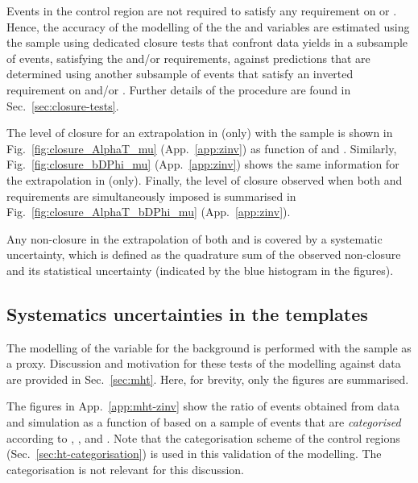 Events in the \mmj control region are not required to satisfy any
requirement on \alphat or \bdphi. Hence, the accuracy of the modelling
of the the \alphat and \bdphi variables are estimated using the \mmj
sample using dedicated closure tests that confront data yields in a
subsample of \mmj events, satisfying the \alphat and/or \bdphi
requirements, against predictions that are determined using another
subsample of \mmj events that satisfy an inverted requirement on
\alphat and/or \bdphi. Further details of the procedure are found in
Sec.~\ref{sec:closure-tests}. 

The level of closure for an extrapolation in \alphat (only) with the
\mj sample is shown in Fig.~\ref{fig:closure_AlphaT_mu}
(App.~\ref{app:zinv}) as function of \scalht and \njet. Similarly,
Fig.~\ref{fig:closure_bDPhi_mu} (App.~\ref{app:zinv}) shows the same
information for the extrapolation in \bdphi (only). Finally, the level
of closure observed when both \alphat and \bdphi requirements are
simultaneously imposed is summarised in
Fig.~\ref{fig:closure_AlphaT_bDPhi_mu} (App.~\ref{app:zinv}).

Any non-closure in the extrapolation of both \alphat and \bdphi is
covered by a systematic uncertainty, which is defined as the
quadrature sum of the observed non-closure and its statistical
uncertainty (indicated by the blue histogram in the figures). 

\subsection{Systematics uncertainties in the \texorpdfstring{\HTmiss}{MHT} templates}
\label{sec:mht-zinv}

The modelling of the \mht variable for the \znunuj background is
performed with the \mmj sample as a proxy. Discussion and motivation
for these tests of the \mht modelling against data are provided in
Sec.~\ref{sec:mht}. Here, for brevity, only the figures are
summarised.

The figures in App.~\ref{app:mht-zinv} show the ratio of events
obtained from data and simulation as a function of \mht based on a
sample of \mj events that are {\it categorised} according to \njet,
\scalht, and \nb. Note that the \scalht categorisation scheme of the
control regions (Sec.~\ref{sec:ht-categorisation}) is used in this
validation of the \mht modelling. The \nb categorisation is not
relevant for this discussion.

